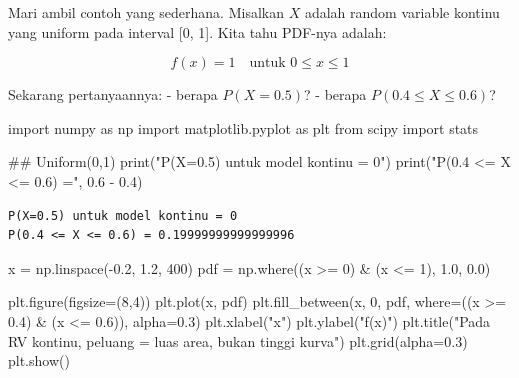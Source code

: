 \documentclass[
  letterpaper,
  DIV=11,
  numbers=noendperiod]{scrreprt}
\newenvironment{Shaded}{\begin{snugshade}}{\end{snugshade}}
\newcommand{\BuiltInTok}[1]{\textcolor[rgb]{0.00,0.23,0.31}{#1}}
\newcommand{\CommentTok}[1]{\textcolor[rgb]{0.37,0.37,0.37}{#1}}
\newcommand{\DecValTok}[1]{\textcolor[rgb]{0.68,0.00,0.00}{#1}}
\newcommand{\FloatTok}[1]{\textcolor[rgb]{0.68,0.00,0.00}{#1}}
\newcommand{\ImportTok}[1]{\textcolor[rgb]{0.00,0.46,0.62}{#1}}
\newcommand{\NormalTok}[1]{\textcolor[rgb]{0.00,0.23,0.31}{#1}}
\newcommand{\OperatorTok}[1]{\textcolor[rgb]{0.37,0.37,0.37}{#1}}
\newcommand{\StringTok}[1]{\textcolor[rgb]{0.13,0.47,0.30}{#1}}
\begin{document}
Mari ambil contoh yang sederhana. Misalkan \(X\) adalah random variable
kontinu yang uniform pada interval {[}0, 1{]}. Kita tahu PDF-nya adalah:

\[
f(x)=1 \quad \text{untuk } 0 \le x \le 1
\]

Sekarang pertanyaannya: - berapa \(P(X=0.5)\)? - berapa
\(P(0.4 \le X \le 0.6)\)?

\begin{Shaded}
\begin{Highlighting}[]
\ImportTok{import}\NormalTok{ numpy }\ImportTok{as}\NormalTok{ np}
\ImportTok{import}\NormalTok{ matplotlib.pyplot }\ImportTok{as}\NormalTok{ plt}
\ImportTok{from}\NormalTok{ scipy }\ImportTok{import}\NormalTok{ stats}

\CommentTok{\#\# Uniform(0,1)}
\BuiltInTok{print}\NormalTok{(}\StringTok{"P(X=0.5) untuk model kontinu = 0"}\NormalTok{)}
\BuiltInTok{print}\NormalTok{(}\StringTok{"P(0.4 \textless{}= X \textless{}= 0.6) ="}\NormalTok{, }\FloatTok{0.6} \OperatorTok{{-}} \FloatTok{0.4}\NormalTok{)}
\end{Highlighting}
\end{Shaded}

\begin{verbatim}
P(X=0.5) untuk model kontinu = 0
P(0.4 <= X <= 0.6) = 0.19999999999999996
\end{verbatim}

\begin{Shaded}
\begin{Highlighting}[]
\NormalTok{x }\OperatorTok{=}\NormalTok{ np.linspace(}\OperatorTok{{-}}\FloatTok{0.2}\NormalTok{, }\FloatTok{1.2}\NormalTok{, }\DecValTok{400}\NormalTok{)}
\NormalTok{pdf }\OperatorTok{=}\NormalTok{ np.where((x }\OperatorTok{\textgreater{}=} \DecValTok{0}\NormalTok{) }\OperatorTok{\&}\NormalTok{ (x }\OperatorTok{\textless{}=} \DecValTok{1}\NormalTok{), }\FloatTok{1.0}\NormalTok{, }\FloatTok{0.0}\NormalTok{)}

\NormalTok{plt.figure(figsize}\OperatorTok{=}\NormalTok{(}\DecValTok{8}\NormalTok{,}\DecValTok{4}\NormalTok{))}
\NormalTok{plt.plot(x, pdf)}
\NormalTok{plt.fill\_between(x, }\DecValTok{0}\NormalTok{, pdf, where}\OperatorTok{=}\NormalTok{((x }\OperatorTok{\textgreater{}=} \FloatTok{0.4}\NormalTok{) }\OperatorTok{\&}\NormalTok{ (x }\OperatorTok{\textless{}=} \FloatTok{0.6}\NormalTok{)), alpha}\OperatorTok{=}\FloatTok{0.3}\NormalTok{)}
\NormalTok{plt.xlabel(}\StringTok{"x"}\NormalTok{)}
\NormalTok{plt.ylabel(}\StringTok{"f(x)"}\NormalTok{)}
\NormalTok{plt.title(}\StringTok{"Pada RV kontinu, peluang = luas area, bukan tinggi kurva"}\NormalTok{)}
\NormalTok{plt.grid(alpha}\OperatorTok{=}\FloatTok{0.3}\NormalTok{)}
\NormalTok{plt.show()}
\end{Highlighting}
\end{Shaded}
\end{document}
